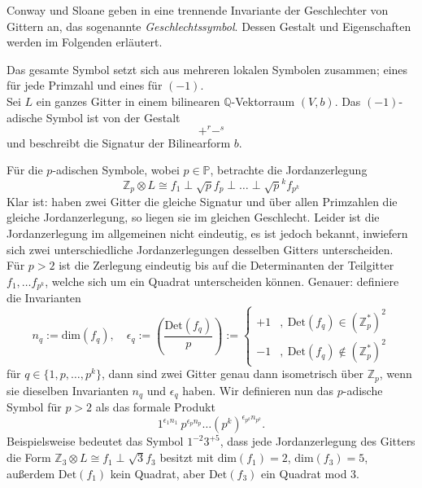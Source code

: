 \documentclass[12pt,a4paper,halfparskip,headsepline,bibtotocnumbered]{scrreprt}
\theoremstyle{nummermitklammern}
\theoremstyle{nonumberbreak}
\newcommand{\Z}{\mathbb{Z}}
\newcommand{\Q}{\mathbb{Q}}
\renewcommand{\P}{\mathbb{P}}
\newcommand{\Det}{\text{Det}}
\begin{document}
Conway und Sloane geben in\cite[Kap. 15, Abs. 7]{conway} eine trennende Invariante der Geschlechter von Gittern an, das sogenannte \textit{Geschlechtssymbol}. Dessen Gestalt und Eigenschaften werden im Folgenden erläutert.\par
Das gesamte Symbol setzt sich aus mehreren lokalen Symbolen zusammen; eines für jede Primzahl und eines für $(-1)$.\\
Sei $L$ ein ganzes Gitter in einem bilinearen $\Q$-Vektorraum $(V,b)$. Das $(-1)$-adische Symbol ist von der Gestalt
\begin{equation*}
	+^r -^s
\end{equation*}
und beschreibt die Signatur der Bilinearform $b$.\par
Für die $p$-adischen Symbole, wobei $p \in \P$, betrachte die Jordanzerlegung
\begin{equation*}
	\Z_p \otimes L \cong f_1 \perp \sqrt{p} f_p \perp \dots \perp \sqrt{p}^k f_{p^k}
\end{equation*}
Klar ist: haben zwei Gitter die gleiche Signatur und über allen Primzahlen die gleiche Jordanzerlegung, so liegen sie im gleichen Geschlecht. Leider ist die Jordanzerlegung im allgemeinen nicht eindeutig, es ist jedoch bekannt, inwiefern sich zwei unterschiedliche Jordanzerlegungen desselben Gitters unterscheiden.\\
Für $p > 2$ ist die Zerlegung eindeutig bis auf die Determinanten der Teilgitter $f_1, \dots f_{p^k}$, welche sich um ein Quadrat unterscheiden können. Genauer: definiere die Invarianten
\begin{equation*}
	n_q := \text{dim}(f_q), \quad \epsilon_q := \left( \frac{\Det(f_q)}{p} \right) := \begin{cases} +1 &,\ \Det(f_q) \in (\Z_p^\ast)^2 \\ -1 &,\ \Det(f_q) \not\in (\Z_p^\ast)^2 \end{cases}
\end{equation*}
für $q \in \lbrace 1, p, \dots, p^k \rbrace$, dann sind zwei Gitter genau dann isometrisch über $\Z_p$, wenn sie dieselben Invarianten $n_q$ und $\epsilon_q$ haben. Wir definieren nun das $p$-adische Symbol für $p > 2$ als das formale Produkt
\begin{equation*}
	1^{\epsilon_1 n_1}\ p^{\epsilon_p n_p} \dots \left(p^k\right)^{\epsilon_{p^k} n_{p^k}}.
\end{equation*}
Beispielsweise bedeutet das Symbol $1^{-2} 3^{+5}$, dass jede Jordanzerlegung des Gitters die Form $\Z_3 \otimes L \cong f_1 \perp \sqrt{3} f_3$ besitzt mit $\text{dim}(f_1) = 2$, $\text{dim}(f_3) = 5$, außerdem $\Det(f_1)$ kein Quadrat, aber $\Det(f_3)$ ein Quadrat mod $3$.\par
\end{document}
